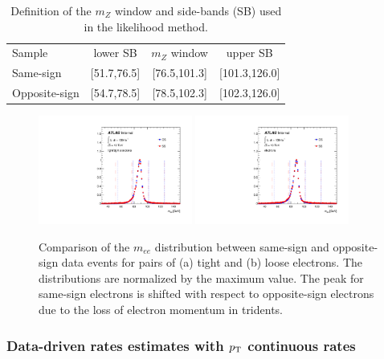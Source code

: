 \smallskip

\begin{table}[h!]
  \begin{center}
    \begin{tabular}{l c c c}
      Sample & lower SB & $m_Z$ window & upper SB \\
      Same-sign & [51.7,76.5] & [76.5,101.3] & [101.3,126.0] \\
      Opposite-sign & [54.7,78.5] & [78.5,102.3] & [102.3,126.0] \\
    \end{tabular}
     \caption{Definition of the $m_Z$ window and side-bands (SB) used in the likelihood method.\label{tab:QMisID:Ranges}}
  \end{center}
\vspace*{-\baselineskip}
\end{table}

\begin{figure}[h!]
  \centering
  \includegraphics[width=0.45\textwidth]{figures/qmisid/mll_tt}
  \includegraphics[width=0.45\textwidth]{figures/qmisid/mll_all}
  \caption{Comparison of the $m_{ee}$ distribution between same-sign and opposite-sign data events for pairs of 
  (a) tight and (b) loose electrons. The distributions are 
  normalized by the maximum value. The peak for same-sign electrons is shifted with respect to opposite-sign 
  electrons due to the loss of electron momentum in tridents.\label{fig:mlldata}}
\end{figure}

\subsubsection{Data-driven rates estimates with $p_{\mathrm{T}}$ continuous rates}


